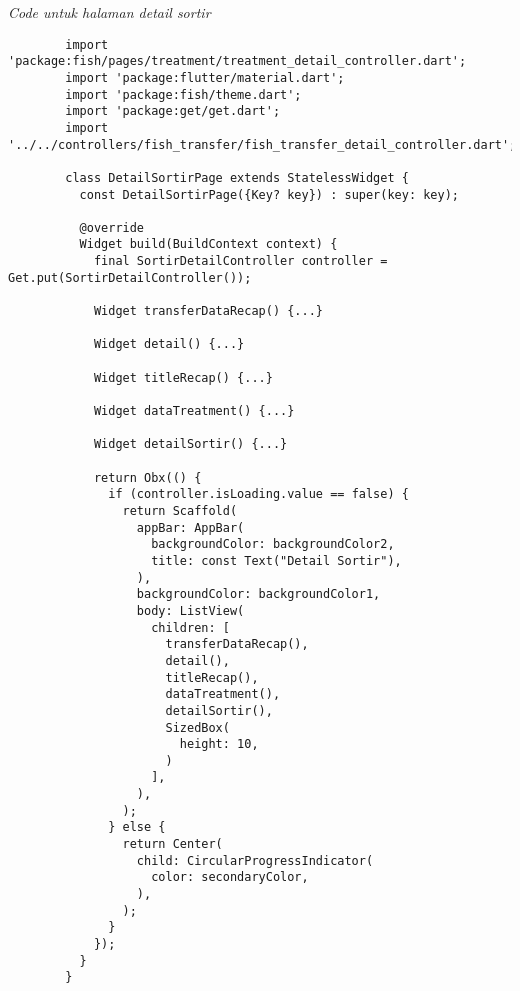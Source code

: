 	\textit{Code untuk halaman detail sortir}
	\begin{lstlisting}
        import 'package:fish/pages/treatment/treatment_detail_controller.dart';
        import 'package:flutter/material.dart';
        import 'package:fish/theme.dart';
        import 'package:get/get.dart';
        import '../../controllers/fish_transfer/fish_transfer_detail_controller.dart';
        
        class DetailSortirPage extends StatelessWidget {
          const DetailSortirPage({Key? key}) : super(key: key);
        
          @override
          Widget build(BuildContext context) {
            final SortirDetailController controller = Get.put(SortirDetailController());
        
            Widget transferDataRecap() {...}
        
            Widget detail() {...}
        
            Widget titleRecap() {...}
        
            Widget dataTreatment() {...}
        
            Widget detailSortir() {...}
        
            return Obx(() {
              if (controller.isLoading.value == false) {
                return Scaffold(
                  appBar: AppBar(
                    backgroundColor: backgroundColor2,
                    title: const Text("Detail Sortir"),
                  ),
                  backgroundColor: backgroundColor1,
                  body: ListView(
                    children: [
                      transferDataRecap(),
                      detail(),
                      titleRecap(),
                      dataTreatment(),
                      detailSortir(),
                      SizedBox(
                        height: 10,
                      )
                    ],
                  ),
                );
              } else {
                return Center(
                  child: CircularProgressIndicator(
                    color: secondaryColor,
                  ),
                );
              }
            });
          }
        }        
	\end{lstlisting}

